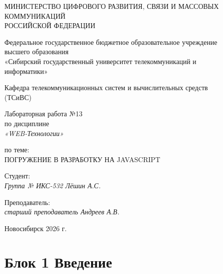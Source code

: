 \documentclass[a4paper,14pt,oneside,openany]{memoir}
\begin{document}
\thispagestyle{empty}

\begin{center}
    МИНИСТЕРСТВО ЦИФРОВОГО РАЗВИТИЯ, СВЯЗИ И МАССОВЫХ \\ КОММУНИКАЦИЙ \\ РОССИЙСКОЙ ФЕДЕРАЦИИ

    \vspace{20pt}

    Федеральное государственное бюджетное образовательное учреждение \\ высшего образования \\
    «Сибирский государственный университет телекоммуникаций и \\ информатики»

    \vspace{20pt}

    Кафедра телекоммуникационных систем и вычислительных средств \\ (ТСиВС)
\end{center}

\vfill

\begin{center}
    Лабораторная работа №13 \\
    по дисциплине \\
    \textit{«WEB-Технологии»}

    \vspace{20pt}

    по теме: \\
    \uppercase{Погружение в разработку на JavaScript}
\end{center}

\vfill

\noindent Студент: \\
\textit{Группа № ИКС-532 \hfill Лёшин А.С.}

\vspace{20pt}

\noindent Преподаватель: \\
\textit{старший преподаватель \hfill Андреев А.В.}

\vfill

\begin{center}
    Новосибирск 2026 г.
\end{center}

\newpage
\setcounter{page}{2}
\OnehalfSpacing*

\section{Блок 1 Введение}
\end{document}

